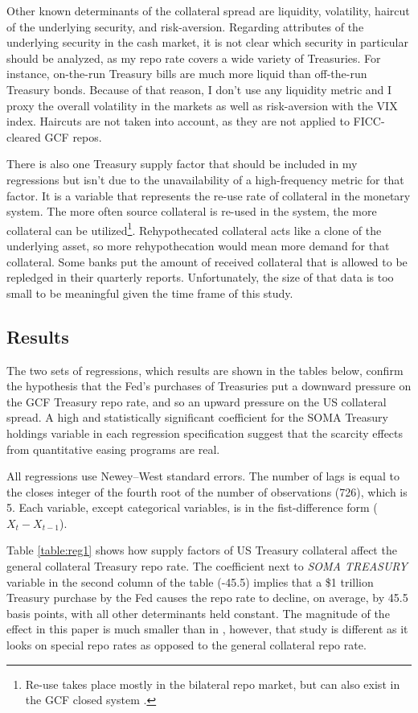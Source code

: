 \documentclass[11pt,a4paper,english,oneside]{article}
\begin{document}
Other known determinants of the collateral spread are liquidity, volatility, haircut of the underlying security, and risk-aversion. Regarding attributes of the underlying security in the cash market, it is not clear which security in particular should be analyzed, as my repo rate covers a wide variety of Treasuries. For instance, on-the-run Treasury bills are much more liquid than off-the-run Treasury bonds. Because of that reason, I don't use any liquidity metric and I proxy the overall volatility in the markets as well as risk-aversion with the VIX index. Haircuts are not taken into account, as they are not applied to FICC-cleared GCF repos.

There is also one Treasury supply factor that should be included in my regressions but isn't due to the unavailability of a high-frequency metric for that factor. It is a variable that represents the re-use rate of collateral in the monetary system. The more often source collateral is re-used in the system, the more collateral can be utilized\footnote{Re-use takes place mostly in the bilateral repo market, but can also exist in the GCF closed system \citep{singh2020}.}. Rehypothecated collateral acts like a clone of the underlying asset, so more rehypothecation would mean more demand for that collateral. Some banks put the amount of received  collateral that is allowed to be repledged in their quarterly reports. Unfortunately, the size of that data is too small to be meaningful given the time frame of this study.

\subsection{Results} \label{sec:results}

The two sets of regressions, which results are shown in the tables below, confirm the hypothesis that the Fed's purchases of Treasuries put a downward pressure on the GCF Treasury repo rate, and so an upward pressure on the US collateral spread. A high and statistically significant coefficient for the SOMA Treasury holdings variable in each regression specification suggest that the scarcity effects from quantitative easing programs are real.

All regressions use Newey–West standard errors. The number of lags is equal to the closes integer of the fourth root of the number of observations (726), which is 5. Each variable, except categorical variables, is in the fist-difference form ($X_t-X_{t-1}$).

Table \ref{table:reg1} shows how supply factors of US Treasury collateral affect the general collateral Treasury repo rate. The coefficient next to \emph{SOMA TREASURY} variable in the second column of the table (-45.5) implies that a \$1 trillion Treasury purchase by the Fed causes the repo rate to decline, on average, by 45.5 basis points, with all other determinants held constant. The magnitude of the effect in this paper is much smaller than in \citet{damico2014}, however, that study is different as it looks on special repo rates as opposed to the general collateral repo rate.
\end{document}
